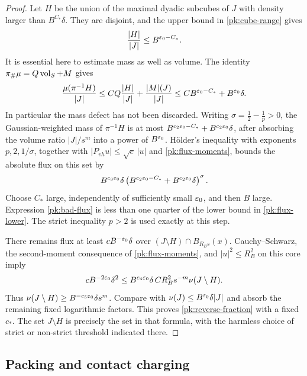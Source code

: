 \begin{proof}
Let $H$ be the union of the maximal dyadic subcubes of $J$
with density larger than $B^{C_*}\delta$.  They are disjoint,
and the upper bound in \eqref{pk:cube-range} gives
\begin{equation}\label{pk:bad-volume}
 \frac{|H|}{|J|}\le B^{\varepsilon_0-C_*}.
\end{equation}
It is essential here to estimate mass as well as volume.
The identity $\pi_\#\mu=Q\operatorname{vol}_S+M$ gives
\begin{equation}\label{pk:bad-mass}
 \frac{\mu(\pi^{-1}H)}{|J|}
 \le C Q\frac{|H|}{|J|}+\frac{|M|(J)}{|J|}
 \le C B^{\varepsilon_0-C_*}+B^{\varepsilon_0}\delta.
\end{equation}
In particular the mass defect has not been discarded.  Writing
$\sigma=\tfrac12-\tfrac1p>0$, the Gaussian-weighted mass of
$\pi^{-1}H$ is at most
$B^{c_2\varepsilon_0-C_*}+B^{c_2\varepsilon_0}\delta$, after absorbing
the volume ratio $|J|/s^m$ into a power of $B^{\varepsilon_0}$.
H\"older's inequality with exponents $p,2,1/\sigma$, together
with $|P_{vh}u|\le\sqrt e\,|u|$ and
\eqref{pk:flux-moments}, bounds the absolute flux on this set
by
\begin{equation}\label{pk:bad-flux}
 B^{c_3\varepsilon_0}\delta
 \left(B^{c_2\varepsilon_0-C_*}+B^{c_2\varepsilon_0}\delta\right)^\sigma.
\end{equation}
Choose $C_*$ large, independently of sufficiently small
$\varepsilon_0$, and then $B$ large.  Expression
\eqref{pk:bad-flux} is less than one quarter of the lower
bound in \eqref{pk:flux-lower}.  The strict inequality $p>2$
is used exactly at this step.

There remains flux at least $cB^{-\varepsilon_0}\delta$ over
$(J\setminus H)\cap B_{R_Bs}(x)$.  Cauchy--Schwarz, the
second-moment consequence of \eqref{pk:flux-moments}, and
$|u|^2\le R_B^2$ on this core imply
\[
 cB^{-2\varepsilon_0}\delta^2
 \le B^{c_4\varepsilon_0}\delta\,
       C R_B^2s^{-m}\nu(J\setminus H).
\]
Thus $\nu(J\setminus H)\ge
B^{-c_5\varepsilon_0}\delta s^m$.  Compare with
$\nu(J)\le B^{\varepsilon_0}\delta|J|$ and absorb the remaining
fixed logarithmic factors.  This proves
\eqref{pk:reverse-fraction} with a fixed $c_*$.  The set
$J\setminus H$ is precisely the set in that formula, with
the harmless choice of strict or non-strict threshold indicated
there.
\end{proof}

\subsection{Packing and contact charging}

